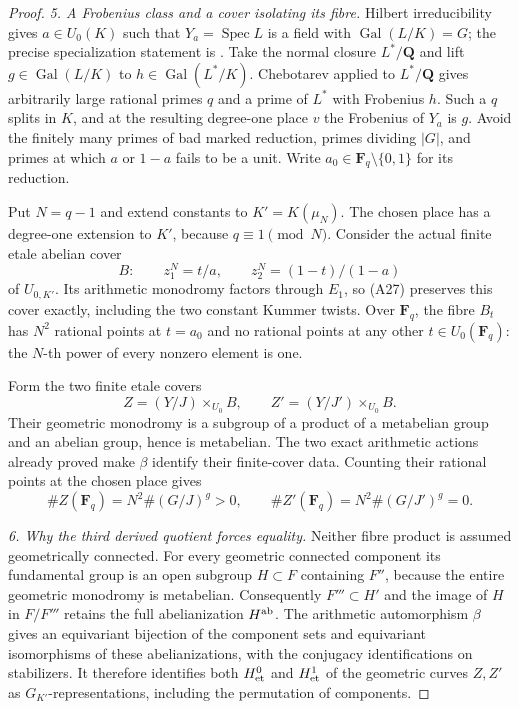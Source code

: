\documentclass[11pt,oneside]{article}
\begin{document}
\begin{proof}
\emph{5. A Frobenius class and a cover isolating its fibre.}
Hilbert irreducibility gives $a\in U_0(K)$ such that
$Y_a=\operatorname{Spec}L$ is a field with
$\operatorname{Gal}(L/K)=G$; the precise specialization
statement is \cite[Proposition 3.3.1 and Theorem 3.4.1]{A_SerreTopics}.
Take the normal closure $L^*/\mathbf Q$ and lift
$g\in\operatorname{Gal}(L/K)$ to
$h\in\operatorname{Gal}(L^*/K)$.
Chebotarev applied to $L^*/\mathbf Q$
\cite[Chapter V, Theorem 3.23]{A_MilneCFT}
gives arbitrarily large rational primes $q$ and a prime
of $L^*$ with Frobenius $h$. Such a $q$ splits in $K$,
and at the resulting degree-one place $v$ the Frobenius
of $Y_a$ is $g$. Avoid the finitely many primes of bad
marked reduction, primes dividing $|G|$, and primes
at which $a$ or $1-a$ fails to be a unit. Write
$a_0\in\mathbf F_q\setminus\{0,1\}$ for its reduction.

Put $N=q-1$ and extend constants to $K'=K(\mu_N)$.
The chosen place has a degree-one extension to $K'$,
because $q\equiv1\pmod N$. Consider the actual finite
etale abelian cover
\[
 B:\qquad z_1^N=t/a,\qquad
               z_2^N=(1-t)/(1-a)                            \tag{A29}
\]
of $U_{0,K'}$. Its arithmetic monodromy factors through
$E_1$, so (A27) preserves this cover exactly, including
the two constant Kummer twists. Over $\mathbf F_q$,
the fibre $B_t$ has $N^2$ rational points at $t=a_0$
and no rational points at any other $t\in U_0(\mathbf F_q)$:
the $N$-th power of every nonzero element is one.

Form the two finite etale covers
\[
 Z=(Y/J)\times_{U_0}B,
       \qquad Z'=(Y/J')\times_{U_0}B.
\]
Their geometric monodromy is a subgroup of a product
of a metabelian group and an abelian group, hence is
metabelian. The two exact arithmetic actions already
proved make $\beta$ identify their finite-cover data.
Counting their rational points at the chosen place gives
\[
 \#Z(\mathbf F_q)=N^2\#(G/J)^g>0,
       \qquad \#Z'(\mathbf F_q)=N^2\#(G/J')^g=0.              \tag{A30}
\]

\emph{6. Why the third derived quotient forces equality.}
Neither fibre product is assumed geometrically connected.
For every geometric connected component its fundamental
group is an open subgroup $H\subset F$ containing $F''$,
because the entire geometric monodromy is metabelian.
Consequently $F'''\subset H'$ and the image of $H$ in
$F/F'''$ retains the full abelianization $H^{\rm ab}$.
The arithmetic automorphism $\beta$ gives an equivariant
bijection of the component sets and equivariant
isomorphisms of these abelianizations, with the conjugacy
identifications on stabilizers. It therefore identifies
both $H^0_{\rm et}$ and $H^1_{\rm et}$ of the geometric
curves $Z,Z'$ as $G_{K'}$-representations, including the
permutation of components.


\end{proof}
\end{document}
